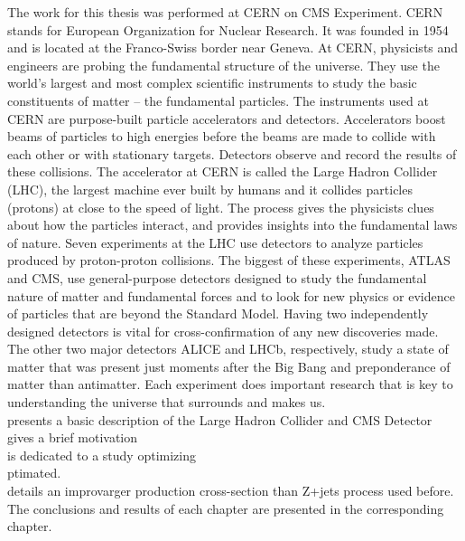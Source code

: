
The work for this thesis was performed at CERN on CMS Experiment. CERN stands for European Organization for Nuclear Research. It was founded in 1954 and is located at the Franco-Swiss border near Geneva. At CERN, physicists and engineers are probing the fundamental structure of the universe. They use the world's largest and most complex scientific instruments to study the basic constituents of matter – the fundamental particles. The instruments used at CERN are purpose-built particle accelerators and detectors. Accelerators boost beams of particles to high energies before the beams are made to collide with each other or with stationary targets. Detectors observe and record the results of these collisions. The accelerator at CERN is called the Large Hadron Collider (LHC), the largest machine ever built by humans and it collides particles (protons) at close to the speed of light. The process gives the physicists clues about how the particles interact, and provides insights into the fundamental laws of nature. Seven experiments at the LHC use detectors to analyze particles produced by proton-proton collisions. The biggest of these experiments, ATLAS and CMS, use general-purpose detectors designed to study the fundamental nature of matter and fundamental forces and to look for new physics or evidence of particles that are beyond the Standard Model. Having two independently designed detectors is vital for cross-confirmation of any new discoveries made. The other two major detectors ALICE and LHCb, respectively, study a state of matter that was present just moments after the Big Bang and preponderance of matter than antimatter.  Each experiment does important research that is key to understanding the universe that surrounds and makes us.\\

 presents a basic description of the Large Hadron Collider and CMS Detector\\

 gives a brief motivation \\

 is dedicated to a study optimizing\\

 ptimated.\\

 details an improvarger production cross-section than Z+jets process used before.\\

The conclusions and results of each chapter are presented in the corresponding chapter.\\

